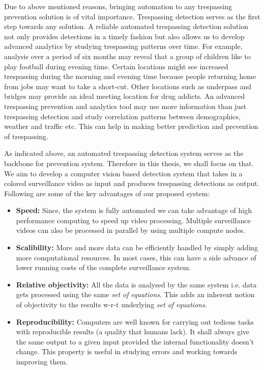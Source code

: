Due to above mentioned reasons, bringing automation to any trespassing prevention solution is of vital importance. Trespassing detection serves as the first step towards any solution. A reliable automated trespassing detection solution  not only provides detections in a timely fashion but also allows us to develop advanced analytics by studying trespassing patterns over time. For example, analysis over a period of six months may reveal that a group of children like to play football during evening time. Certain locations might see increased trespassing during the morning and evening time because people returning home from jobs may want to take a short-cut. Other locations such as underpass and bridges may provide an ideal meeting location for drug addicts.  An advanced trespassing prevention and analytics tool may use more information than just trespassing detection and study correlation patterns between demographics, weather and traffic etc.  This can help in making better prediction and prevention of trespassing.

As indicated above, an automated trespassing detection system serves as the backbone for prevention system. Therefore in this thesis, we shall focus on that. We aim to develop a computer vision based detection system that takes in a colored surveillance video as  input and produces  trespassing detections as output. Following are some of the key advantages of our proposed system:


\begin{itemize}

\item \textbf{Speed:} Since, the system is fully automated we can take advantage of high performance computing to speed up video processing. Multiple surveillance videos can also be processed in parallel by using multiple compute nodes. 

\item \textbf{Scalibility:} More and more data can be efficiently handled by simply adding more computational resources. In most cases, this can have a side advance of lower running costs of the complete surveillance system.
 
\item \textbf{Relative objectivity:} All the data is analysed by the same system i.e. data gets processed using the same \textit{set of equations}. This adds an inherent notion of objectivity to the results w-r-t underlying \textit{set of equations}.

\item \textbf{Reproducibility:} Computers are well known for carrying out tedious tasks with reproducible results  (a quality that humans lack). It shall always give the same output to a given input provided the internal functionality doesn't change. This property is useful in studying errors and working towards improving them.  
\end{itemize}

